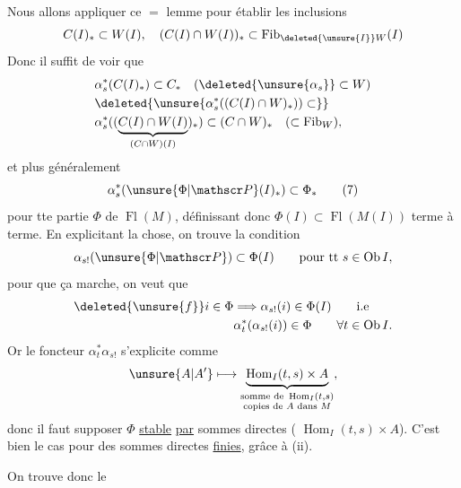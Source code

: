 Nous allons appliquer ce $=$ lemme pour  établir les inclusions
\[
 C(I)_{*}\subset W(I),\quad (C(I)\cap W(I))_{*}\subset\operatorname{Fib}_{\deleted{\unsure{I}}W}(I)
\]
Donc il suffit de voir que
\[
\begin{aligned}
 &\alpha_{s}^{*}(C(I)_{*})\subset C_{*}\quad(\deleted{\unsure{\alpha_s}}\subset W)\\
 &\deleted{\unsure{\alpha_{s}^{*}((C(I)\cap W)_{*}))\subset}}\\
 &\alpha_{s}^{*}((\underbrace{C(I)\cap W(I)}_{(C\cap W)(I)})_{*})\subset(C\cap W)_{*}\quad(\subset\operatorname{Fib}_{W}),
\end{aligned}
\]
et plus généralement
\[
 \alpha_{s}^{*}(\unsure{\Phi|\mathscr P}(I)_{*})\subset\Phi_{*}\tag*{(7)}
\]
pour tte \inserted{(!)} partie $\Phi$ de $\operatorname{Fl}(M)$, définissant donc $\Phi(I)\subset\operatorname{Fl}(M(I))$ terme à terme.
\endgroup
{}
En explicitant la chose, on trouve la condition
\[
 \alpha_{s!}(\unsure{\Phi|\mathscr P})\subset\Phi(I)\qquad\text{pour tt }s\in\operatorname{Ob} I,
\]
pour que ça marche,  on veut que
\[
\begin{aligned}
 \deleted{\unsure{f}}i\in\Phi&\Longrightarrow\alpha_{s!}(i)\in\Phi(I)\qquad\text{i.e}\\
 &\alpha_{t}^{*}(\alpha_{s!}(i))\in\Phi\qquad\forall t\in\operatorname{Ob}I.
\end{aligned}
\]
Or le foncteur $\alpha_{t}^{*}\alpha_{s!}$ s'explicite comme
\[
 \unsure{A|A'}\longmapsto\underbrace{\operatorname{Hom}_{I}(t,s)\times A}_{\substack{\text{somme de }\operatorname{Hom}_{I}(t,s)\\\text{copies de }A\text{ dans }M}},
\]
donc il faut supposer $\Phi$ \uline{stable} \uline{par} sommes directes ( $\operatorname{Hom}_{I}(t,s)\times A$). C'est bien le cas pour  des sommes directes \uline{finies}, grâce à (ii).

 On trouve donc le

